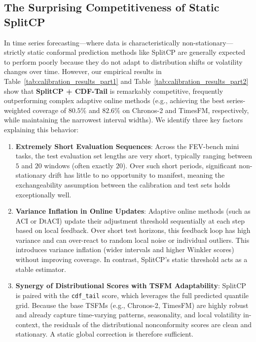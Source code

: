 \documentclass[12pt, a4paper]{article}
\begin{document}
\subsection{The Surprising Competitiveness of Static SplitCP}
In time series forecasting—where data is characteristically non-stationary—strictly static conformal prediction methods like SplitCP are generally expected to perform poorly because they do not adapt to distribution shifts or volatility changes over time. However, our empirical results in Table~\ref{tab:calibration_results_part1} and Table~\ref{tab:calibration_results_part2} show that \textbf{SplitCP + CDF-Tail} is remarkably competitive, frequently outperforming complex adaptive online methods (e.g., achieving the best series-weighted coverage of \(80.5\%\) and \(82.6\%\) on Chronos-2 and TimesFM, respectively, while maintaining the narrowest interval widths). We identify three key factors explaining this behavior:
\begin{enumerate}
	\item \textbf{Extremely Short Evaluation Sequences}: Across the FEV-bench mini tasks, the test evaluation set lengths are very short, typically ranging between \(5\) and \(20\) windows (often exactly \(20\)). Over such short periods, significant non-stationary drift has little to no opportunity to manifest, meaning the exchangeability assumption between the calibration and test sets holds exceptionally well.
	\item \textbf{Variance Inflation in Online Updates}: Adaptive online methods (such as ACI or DtACI) update their adjustment threshold sequentially at each step based on local feedback. Over short test horizons, this feedback loop has high variance and can over-react to random local noise or individual outliers. This introduces variance inflation (wider intervals and higher Winkler scores) without improving coverage. In contrast, SplitCP's static threshold acts as a stable estimator.
	\item \textbf{Synergy of Distributional Scores with TSFM Adaptability}: SplitCP is paired with the \texttt{cdf\_tail} score, which leverages the full predicted quantile grid. Because the base TSFMs (e.g., Chronos-2, TimesFM) are highly robust and already capture time-varying patterns, seasonality, and local volatility in-context, the residuals of the distributional nonconformity scores are clean and stationary. A static global correction is therefore sufficient.
\end{enumerate}
\end{document}
